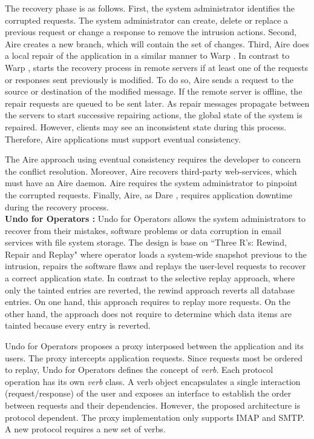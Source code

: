 The recovery phase is as follows. First, the system administrator identifies the corrupted requests. The system administrator can create, delete or replace a previous request or change a response to remove the intrusion actions. Second, Aire creates a new branch, which will contain the set of changes. Third, Aire does a local repair of the application in a similar manner to Warp \cite{warp}. In contrast to Warp \cite{warp}, starts the recovery process in remote servers if at least one of the requests or responses sent previously is modified. To do so, Aire sends a request to the source or destination of the modified message. If the remote server is offline, the repair requests are queued to be sent later. As repair messages propagate between the servers to start successive repairing actions, the global state of the system is repaired. However, clients may see an inconsistent state during this process. Therefore, Aire applications must support eventual consistency.  

The Aire approach using eventual consistency requires the developer to concern the conflict resolution. Moreover, Aire recovers third-party web-services, which must have an Aire daemon. Aire requires the system administrator to pinpoint the corrupted requests. Finally, Aire, as Dare \cite{dare}, requires application downtime during the recovery process.\\



\textbf{Undo for Operators \cite{undoForOperators}: }Undo for Operators allows the system administrators to recover from their mistakes, software problems or data corruption in email services with file system storage. The design is base on ``Three R's: Rewind, Repair and Replay" \cite{Brownc} where operator loads a system-wide snapshot previous to the intrusion, repairs the software flaws and replays the user-level requests to recover a correct application state. In contrast to the selective replay approach, where only the tainted entries are reverted, the rewind approach reverts all database entries. On one hand, this approach requires to replay more requests. On the other hand, the approach does not require to determine which data items are tainted because every entry is reverted.

Undo for Operators proposes a proxy interposed between the application and its users. The proxy intercepts application requests. Since requests most be ordered to replay, Undo for Operators defines the concept of \textit{verb}. Each protocol operation has its own \textit{verb} class. A verb object encapsulates a single interaction (request/response) of the user and exposes an interface to establish the order between requests and their dependencies. However, the proposed architecture is protocol dependent. The proxy implementation only supports \ac{IMAP} and {SMTP}. A new protocol requires a new set of verbs. 

